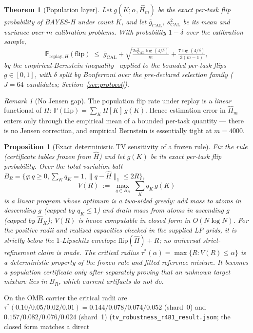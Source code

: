 \documentclass{article}
\newtheorem{theorem}{Theorem}
\newtheorem{proposition}{Proposition}
\theoremstyle{definition}
\theoremstyle{remark}
\newtheorem{remark}{Remark}
\newcommand{\flip}{\mathrm{flip}}
\newcommand{\calD}{\mathrm{CAL}}
\renewcommand{\P}{\mathbb{P}}
\begin{document}
\begin{theorem}[Population layer]
\label{thm:pop}
Let $g(K;\alpha,\widehat H_m)$ be the exact per-task flip probability of
BAYES-H under count $K$, and let
$\bar g_{\calD}$, $s^2_{\calD}$ be its mean and variance over $m$ calibration
problems. With probability $1-\delta$ over the calibration sample,
\[
\P_{\text{replay},H}(\flip) \;\le\; \bar g_{\calD}
+ \sqrt{\tfrac{2 s^2_{\calD}\log(4/\delta)}{m}}
+ \tfrac{7\log(4/\delta)}{3(m-1)},
\]
by the empirical-Bernstein inequality~\citep{maurer2009eb} applied to the
bounded per-task flips $g\in[0,1]$, with $\delta$ split by Bonferroni over the
pre-declared selection family ($J=64$ candidates; Section~\ref{sec:protocol}).
\end{theorem}
\begin{remark}[No Jensen gap]
The population flip rate under replay is a \emph{linear} functional of $H$:
$\P(\flip)=\sum_K H[K]\,g(K)$. Hence estimation error in $\widehat H_m$ enters
only through the empirical mean of a bounded per-task quantity --- there is no
Jensen correction, and empirical Bernstein is essentially tight at $m=4000$.
\end{remark}
\begin{proposition}[Exact deterministic TV sensitivity of a frozen rule]
\label{prop:tv}
Fix the rule (certificate tables frozen from $\widehat H$) and let $g(K)$ be
its exact per-task flip probability. Over the total-variation ball
$B_R=\{q:q\ge0,\sum_K q_K=1,\|q-\widehat H\|_1\le 2R\}$,
\[
V(R)\;:=\;\max_{q\in B_R}\;\textstyle\sum_K q_K\,g(K)
\]
is a linear program whose optimum is a two-sided greedy: add mass to atoms in
descending $g$ (capped by $q_K\le1$) and drain mass from atoms in ascending
$g$ (capped by $\widehat H_K$); $V(R)$ is hence computable in closed form in
$O(N\log N)$. For the positive radii and realized capacities checked in the
supplied LP grids, it is strictly below the $1$-Lipschitz envelope
$\flip(\widehat H)+R$; no universal strict-refinement claim is made. The
\emph{critical radius} $\tau^*(\alpha)=\max\{R:V(R)\le\alpha\}$ is a
deterministic property of the frozen rule and fitted reference mixture. It
becomes a population certificate only after separately proving that an unknown
target mixture lies in $B_R$, which current artifacts do not do.
\end{proposition}
On the OMR carrier the critical radii are
$\tau^*(0.10/0.05/0.02/0.01)=0.144/0.078/0.074/0.052$
(shard~0) and $0.157/0.082/0.076/0.024$ (shard~1)
(\texttt{tv\_robustness\_r481\_result.json}; the closed form matches a direct
\end{document}
